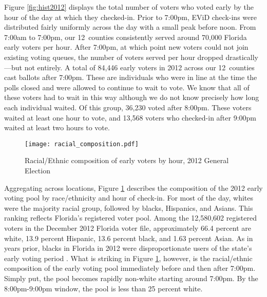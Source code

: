 \documentclass[12pt,titlepage]{article}
\newcommand{\numcounties}{12}
\begin{document}
Figure \ref{fig:hist2012} displays the total number of voters who
voted early by the hour of the day at which they checked-in. Prior to
7:00pm, EViD check-ins were distributed fairly uniformly across the
day with a small peak before noon.  From 7:00am to 7:00pm, our
\numcounties\ counties consistently served around 70,000 Florida early
voters per hour. After 7:00pm, at which point new voters could not
join existing voting queues, the number of voters served per hour
dropped drastically---but not entirely.  A total of 84,446 early
voters in 2012 across our \numcounties\ counties cast ballots after
7:00pm. These are individuals who were in line at the time the polls
closed and were allowed to continue to wait to vote.  We know that all
of these voters had to wait in this way although we do not know
precisely how long each individual waited.  Of this group, 36,230
voted after 8:00pm.  These voters waited at least one hour to vote,
and 13,568 voters who checked-in after 9:00pm waited at least two
hours to vote.



\begin{figure}[!ht]
\caption{Racial/Ethnic composition of early voters by hour, 2012 General Election}
  \label{fig:race2012}
  \centering
    \centering\texttt{[image: racial\_composition.pdf]}
\end{figure}

Aggregating across locations, Figure \ref{fig:race2012} describes the
composition of the 2012 early voting pool by race/ethnicity and hour
of check-in.  For most of the day, whites were the majority racial
group, followed by blacks, Hispanics, and Asians.  This ranking
reflects Florida's registered voter pool.  Among the 12,580,602
registered voters in the December 2012 Florida voter file,
approximately 66.4 percent are white, 13.9 percent Hispanic, 13.6
percent black, and 1.63 percent Asian.  As in years prior, blacks in
Florida in 2012 were disproportionate users of the state's early
voting period \citep{herronsmith:souls}.  What is striking in Figure
\ref{fig:race2012}, however, is the racial/ethnic composition of the
early voting pool immediately before and then after 7:00pm.  Simply
put, the pool becomes rapidly non-white starting around 7:00pm.  By
the 8:00pm-9:00pm window, the pool is less than 25 percent white.
\end{document}
